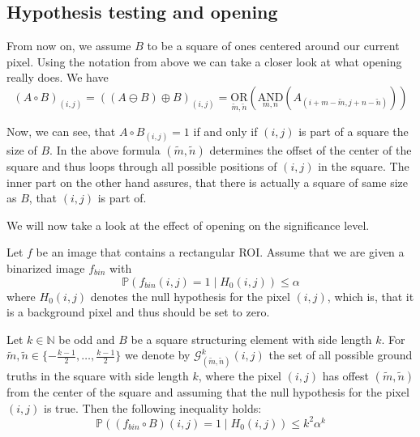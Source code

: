 \documentclass{beamer}
\begin{document}
\begin{frame}
	\subsection{Hypothesis testing and opening}
	
	From now on, we assume $B$ to be a square of ones centered around our current pixel. Using the notation from above we can take a closer look at what opening really does. We have
	\begin{equation*}
		(A \circ B)_{(i, j)} = ((A \ominus B) \oplus B)_{(i, j)} = \underset{\tilde{m}, \tilde{n}}{\mathrm{OR}} \left( \underset{m, n}{\mathrm{AND}} ( A_{(i + m - \tilde{m}, j + n - \tilde{n})} ) \right)
	\end{equation*}
	
	Now, we can see, that $A \circ B_{(i, j)} = 1$ if and only if $(i, j)$ is part of a square the size of $B$. In the above formula $(\tilde{m}, \tilde{n})$ determines the offset of the center of the square and thus loops through all possible positions of $(i, j)$ in the square. The inner part on the other hand assures, that there is actually a square of same size as $B$, that $(i, j)$ is part of.
\end{frame}

\begin{frame}
	We will now take a look at the effect of opening on the significance level.
	
	\begin{theorem}
		Let $f$ be an image that contains a rectangular ROI. Assume that we are given a binarized image $f_{bin}$ with
		\begin{equation*}
			\mathbb{P}(f_{bin}(i, j) = 1 \mid H_0(i, j)) \leq \alpha
		\end{equation*}
		where $H_0(i, j)$ denotes the null hypothesis for the pixel $(i, j)$, which is, that it is a background pixel and thus should be set to zero.
		
		Let $k \in \mathbb{N}$ be odd and $B$ be a square structuring element with side length $k$. For $\tilde{m}, \tilde{n} \in \{ -\frac{k - 1}{2}, \dots, \frac{k - 1}{2} \}$ we denote by $\mathcal{G}_{(\tilde{m}, \tilde{n})}^k(i, j)$ the set of all possible ground truths in the square with side length $k$, where the pixel $(i, j)$ has offest $(\tilde{m}, \tilde{n})$ from the center of the square and assuming that the null hypothesis for the pixel $(i, j)$ is true.
		Then the following inequality holds:
		\begin{equation*}
			\mathbb{P}((f_{bin} \circ B)(i, j) = 1 \mid H_0(i, j)) \leq k^2 \alpha^k
		\end{equation*}
	\end{theorem}
\end{frame}
\end{document}
